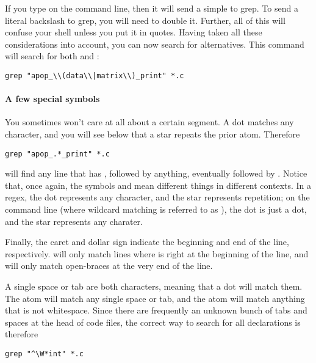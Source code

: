 If you type \ci{$\backslash$|} on the command line, then it will send a
simple \ci{|} to grep. To send a literal backslash to grep, you will
need to double it. Further, all of this will confuse your shell unless
you put it in quotes. Having taken all these considerations into
account, you can now search for alternatives. This command will search
for both  and :
\begin{lstlisting}
grep "apop_\\(data\\|matrix\\)_print" *.c
\end{lstlisting}

\paragraph{A few special symbols}
You sometimes won't care at all about a certain segment. A 
dot matches any character, and you will see below that a star 
repeats the prior atom. Therefore
\begin{lstlisting}
grep "apop_.*_print" *.c
\end{lstlisting}
will find any line that has , followed by anything,
eventually followed by . Notice that, once again, the
symbols  and \ci{*} mean different things in different contexts.
In a regex, the dot represents any character, and the star represents
repetition; on the command line (where wildcard matching is referred to
as ), the dot is just a dot, and the star represents any
charater.

Finally, the caret and dollar sign indicate the beginning and end of the
line, respectively.   will only match
lines where  is right at the beginning of the line, and 
 will only match open-braces at the very end of the
line. 

A single space or tab are both characters, meaning that a dot will
match them. The atom  will match any single space or tab,
and the atom  will match anything that is not whitespace.
Since there are frequently an unknown bunch of tabs and spaces at the
head of code files, the correct way to search for all 
declarations is therefore
\begin{lstlisting}
grep "^\W*int" *.c
\end{lstlisting}


